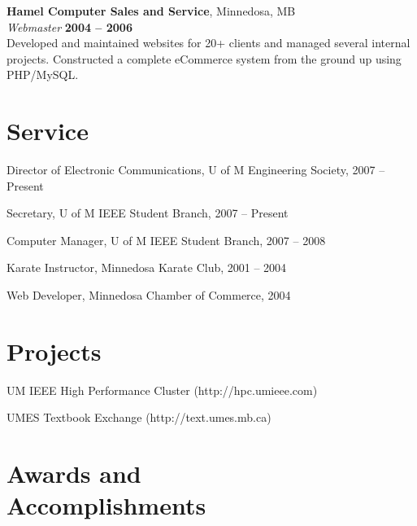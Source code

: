 \documentclass[margin,line,letterpaper]{resume}
\begin{document}
\begin{resume}
  {\bf Hamel Computer Sales and Service}, Minnedosa, MB \vspace{2mm}\\\vspace{1mm}%
  {\sl Webmaster} \hfill {\bf 2004 -- 2006}\\
  Developed and maintained websites for 20+ clients and managed several internal projects.
  Constructed a complete eCommerce system from the ground up using PHP/MySQL.

  \newpage
  \section{\mysidestyle Service}

  \begin{list2}
    \item Director of Electronic Communications, U of M Engineering Society, 2007 -- Present
    \item Secretary, U of M IEEE Student Branch, 2007 -- Present
    \item Computer Manager, U of M IEEE Student Branch, 2007 -- 2008
    \item Karate Instructor, Minnedosa Karate Club, 2001 -- 2004
    \item Web Developer, Minnedosa Chamber of Commerce, 2004
  \end{list2}

  \section{\mysidestyle Projects}

  \begin{list2}
    \item UM IEEE High Performance Cluster (http://hpc.umieee.com)
    \item UMES Textbook Exchange (http://text.umes.mb.ca)
  \end{list2}


  \section{\mysidestyle Awards and\\Accomplishments}


\end{resume}
\end{document}
